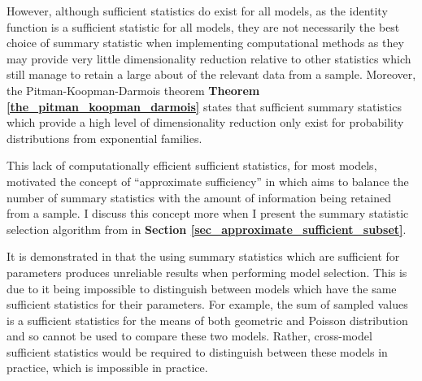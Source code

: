 \documentclass[11pt,a4paper]{article}
\theoremstyle{break}
\begin{document}
  \par However, although sufficient statistics do exist for all models, as the identity function is a sufficient statistic for all models, they are not necessarily the best choice of summary statistic when implementing computational methods as they may provide very little dimensionality reduction relative to other statistics which still manage to retain a large about of the relevant data from a sample. Moreover, the Pitman-Koopman-Darmois theorem \textbf{Theorem \ref{the_pitman_koopman_darmois}} states that sufficient summary statistics which provide a high level of dimensionality reduction only exist for probability distributions from exponential families.

  \par This lack of computationally efficient sufficient statistics, for most models, motivated the concept of ``approximate sufficiency'' in \cite[]{Approximately_sufficient_statistics_and_bayesian_computation} which aims to balance the number of summary statistics with the amount of information being retained from a sample. I discuss this concept more when I present the summary statistic selection algorithm from \cite[]{Approximately_sufficient_statistics_and_bayesian_computation} in \textbf{Section \ref{sec_approximate_sufficient_subset}}.

  \par It is demonstrated in \cite[]{on_model_selection_with_summary_statistics} that the using summary statistics which are sufficient for parameters produces unreliable results when performing model selection. This is due to it being impossible to distinguish between models which have the same sufficient statistics for their parameters. For example, the sum of sampled values is a sufficient statistics for the means of both geometric and Poisson distribution and so cannot be used to compare these two models. Rather, cross-model sufficient statistics would be required to distinguish between these models in practice, which is impossible in practice. %
\end{document}
